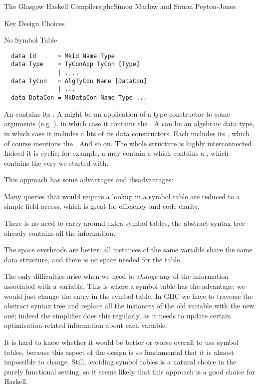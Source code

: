 \begin{aosachapter}{The Glasgow Haskell Compiler}{s:ghc}{Simon Marlow and Simon Peyton-Jones}
\begin{aosasect1}{Key Design Choices}
\begin{aosasect2}{No Symbol Table}
\begin{verbatim}
  data Id      = MkId Name Type
  data Type    = TyConApp TyCon [Type]
               | ....
  data TyCon   = AlgTyCon Name [DataCon]
               | ...
  data DataCon = MkDataCon Name Type ...
\end{verbatim}

An  contains its .  A  might be an
application of a type constructor to some arguments (e.g. ), in which case it contains the .  A 
can be an algebraic data type, in which case it includes a lits of its
data constructors.  Each  includes its ,
which of course mentions the .  And so on.  The whole
structure is highly interconnected.  Indeed it is cyclic; for example,
a  may contain a  which contains a
, which contains the very  we started with.

This approach has some advantages and disadvantages:

\begin{aosaitemize}

\item Many queries that would require a lookup in a symbol table are
  reduced to a simple field access, which is great for efficiency and
  code clarity.

\item There is no need to carry around extra symbol tables, the
  abstract syntax tree already contains all the information.

\item The space overheads are better: all instances of the same
  variable share the same data structure, and there is no space needed
  for the table.

\item The only difficulties arise when we need to \emph{change} any of
  the information associated with a variable.  This is where a symbol
  table has the advantage: we would just change the entry in the
  symbol table.  In GHC we have to traverse the abstract syntax tree
  and replace all the instances of the old variable with the new one;
  indeed the simplifier does this regularly, as it needs to update
  certain optimisation-related information about each variable.

\end{aosaitemize}

It is hard to know whether it would be better or worse overall to use
symbol tables, because this aspect of the design is so fundamental
that it is almost impossible to change.  Still, avoiding symbol tables
is a natural choice in the purely functional setting, so it seems
likely that this approach is a good choice for Haskell.


\end{aosasect2}
\end{aosasect1}
\end{aosachapter}
